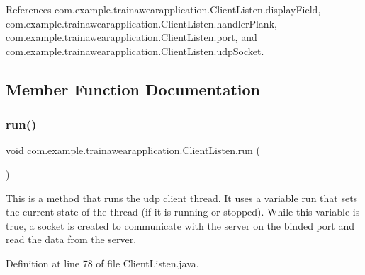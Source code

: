 References com.\+example.\+trainawearapplication.\+Client\+Listen.\+display\+Field, com.\+example.\+trainawearapplication.\+Client\+Listen.\+handler\+Plank, com.\+example.\+trainawearapplication.\+Client\+Listen.\+port, and com.\+example.\+trainawearapplication.\+Client\+Listen.\+udp\+Socket.



\subsection{Member Function Documentation}
\mbox{\label{classcom_1_1example_1_1trainawearapplication_1_1_client_listen_adcb69d9825d6d9e182905cf9b4aa4d7d}} 
\subsubsection{\texorpdfstring{run()}{run()}}
{\footnotesize\ttfamily void com.\+example.\+trainawearapplication.\+Client\+Listen.\+run (\begin{DoxyParamCaption}{ }\end{DoxyParamCaption})\hspace{0.3cm}{\ttfamily [inline]}}

This is a method that runs the udp client thread. It uses a variable run that sets the current state of the thread (if it is running or stopped). While this variable is true, a socket is created to communicate with the server on the binded port and read the data from the server.

Definition at line 78 of file Client\+Listen.\+java.


